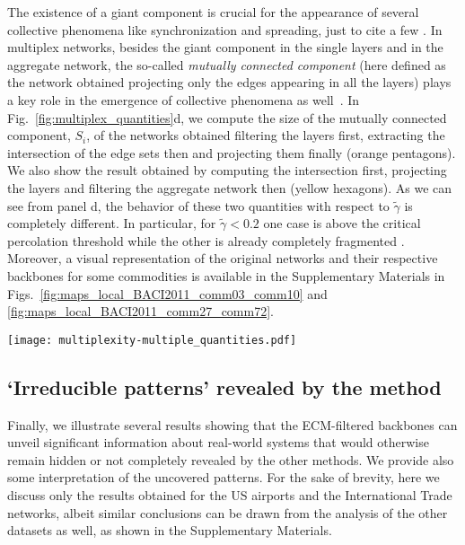 \documentclass[aps,twocolumn,superscriptaddress]{revtex4-1}
\begin{document}
The existence of a giant component is crucial for the appearance of several collective phenomena like synchronization and spreading, just to cite a few \cite{barrat-book-2008}. 
In multiplex networks, besides the giant component in the single layers and in the aggregate network, the so-called \emph{mutually connected component} (here defined as the network obtained projecting only the edges appearing in all the layers) plays a key role in the emergence of collective phenomena as well~\cite{buldyrev-nature-2010}. 
In Fig.~\ref{fig:multiplex_quantities}d, we compute the size of the mutually connected component, $S_i$, of the networks obtained filtering the layers first, extracting the intersection of the edge sets then and projecting them finally (orange pentagons).
We also show the result obtained by computing the intersection first, projecting the layers and filtering the aggregate network then (yellow hexagons). As we can see from panel d, the behavior of these two quantities with respect to $\widetilde{\gamma}$ is completely different. In particular, for $\widetilde{\gamma} < 0.2$ one case is above the critical percolation threshold while the other is already completely fragmented \cite{stauffer-book-1994}. Moreover, a visual representation of the original networks and their respective backbones for some commodities is available in the Supplementary Materials in Figs.~\ref{fig:maps_local_BACI2011_comm03_comm10} and \ref{fig:maps_local_BACI2011_comm27_comm72}.
%
\begin{figure*}[t]
\centering
%
\texttt{[image: multiplexity-multiple\_quantities.pdf]}
%
\caption{Effect of multiplexity on the extraction of the weighted backbone. From top to bottom, we report the Jaccard score $J$ (a), number of edges $L$ (b), size of the giant component $S$ (c) and size of the mutually connected component $S_i$ as a function of $p$-value $\widetilde{\gamma}$. The quantities $L$, $S$ and $S_i$ are computed in networks obtained filtering each layer first and projecting them then (Filter $\rightarrow$ Project/Intersect) or in the inverse order case (Project/Intersect $\rightarrow$ Filtering).}
\label{fig:multiplex_quantities}
\end{figure*}
%


\subsection{`Irreducible patterns' revealed by the method}
Finally, we illustrate several results showing that the ECM-filtered backbones can unveil significant information  about real-world systems that would otherwise remain hidden or not completely revealed by the other methods. 
We provide also some interpretation of the uncovered patterns. 
For the sake of brevity, here we discuss only the results obtained for the US airports and the International Trade networks, albeit similar conclusions can be drawn from the analysis of the other datasets as well, as shown in the Supplementary Materials. 
\end{document}
